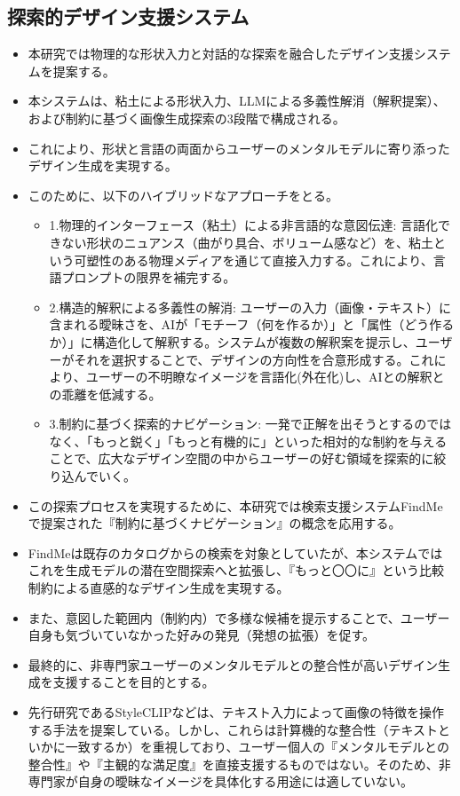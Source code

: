 \documentclass[dvipdfmx]{jlreq}
\begin{document}
\subsection{探索的デザイン支援システム}
\begin{itemize}
  \item 本研究では物理的な形状入力と対話的な探索を融合したデザイン支援システムを提案する。
  \item 本システムは、粘土による形状入力、LLMによる多義性解消（解釈提案）、および制約に基づく画像生成探索の3段階で構成される。
  \item これにより、形状と言語の両面からユーザーのメンタルモデルに寄り添ったデザイン生成を実現する。
  \item このために、以下のハイブリッドなアプローチをとる。
  \begin{itemize}
    \item 1.物理的インターフェース（粘土）による非言語的な意図伝達: 言語化できない形状のニュアンス（曲がり具合、ボリューム感など）を、粘土という可塑性のある物理メディアを通じて直接入力する。これにより、言語プロンプトの限界を補完する。
    \item 2.構造的解釈による多義性の解消: ユーザーの入力（画像・テキスト）に含まれる曖昧さを、AIが「モチーフ（何を作るか）」と「属性（どう作るか）」に構造化して解釈する。システムが複数の解釈案を提示し、ユーザーがそれを選択することで、デザインの方向性を合意形成する。これにより、ユーザーの不明瞭なイメージを言語化(外在化)し、AIとの解釈との乖離を低減する。
    \item 3.制約に基づく探索的ナビゲーション: 一発で正解を出そうとするのではなく、「もっと鋭く」「もっと有機的に」といった相対的な制約を与えることで、広大なデザイン空間の中からユーザーの好む領域を探索的に絞り込んでいく。
  \end{itemize}
  \item この探索プロセスを実現するために、本研究では検索支援システムFindMeで提案された『制約に基づくナビゲーション』の概念を応用する。
  \item FindMeは既存のカタログからの検索を対象としていたが、本システムではこれを生成モデルの潜在空間探索へと拡張し、『もっと〇〇に』という比較制約による直感的なデザイン生成を実現する。
  \item また、意図した範囲内（制約内）で多様な候補を提示することで、ユーザー自身も気づいていなかった好みの発見（発想の拡張）を促す。
  \item 最終的に、非専門家ユーザーのメンタルモデルとの整合性が高いデザイン生成を支援することを目的とする。
  \item 先行研究であるStyleCLIPなどは、テキスト入力によって画像の特徴を操作する手法を提案している。しかし、これらは計算機的な整合性（テキストといかに一致するか）を重視しており、ユーザー個人の『メンタルモデルとの整合性』や『主観的な満足度』を直接支援するものではない。そのため、非専門家が自身の曖昧なイメージを具体化する用途には適していない。
\end{itemize}
\end{document}
